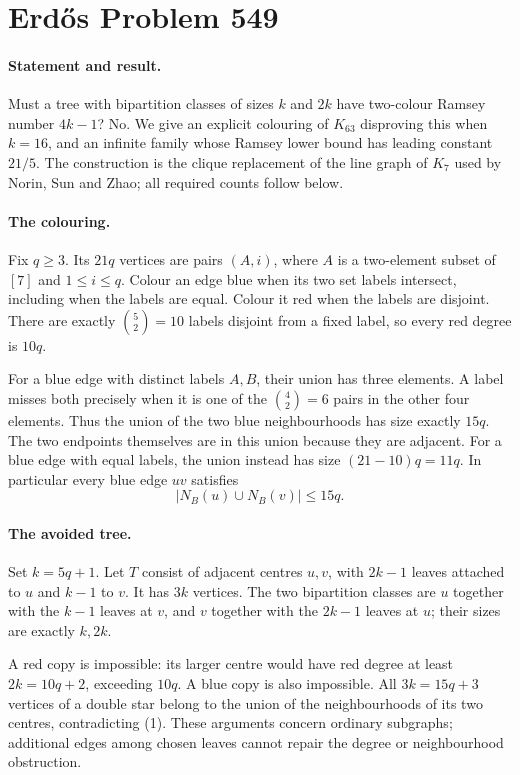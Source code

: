 \section*{Erd\H{o}s Problem 549}

\paragraph{Statement and result.}
Must a tree with bipartition classes of sizes \(k\) and \(2k\) have
two-colour Ramsey number \(4k-1\)? No. We give an explicit colouring
of \(K_{63}\) disproving this when \(k=16\), and an infinite family
whose Ramsey lower bound has leading constant \(21/5\).
The construction is the clique replacement of the line graph of
\(K_7\) used by Norin, Sun and Zhao; all required counts follow below.

\paragraph{The colouring.}
Fix \(q\geq3\). Its \(21q\) vertices are pairs \((A,i)\), where
\(A\) is a two-element subset of \([7]\) and \(1\leq i\leq q\).
Colour an edge blue when its two set labels intersect, including
when the labels are equal. Colour it red when the labels are disjoint.
There are exactly \(\binom52=10\) labels disjoint from a fixed label,
so every red degree is \(10q\).

For a blue edge with distinct labels \(A,B\), their union has three
elements. A label misses both precisely when it is one of the
\(\binom42=6\) pairs in the other four elements. Thus the union of
the two blue neighbourhoods has size exactly \(15q\).
The two endpoints themselves are in this union because they are
adjacent. For a blue edge with equal labels, the union instead has
size \((21-10)q=11q\). In particular every blue edge \(uv\) satisfies
\[
 |N_B(u)\cup N_B(v)|\leq15q. \tag{1}
\]

\paragraph{The avoided tree.}
Set \(k=5q+1\). Let \(T\) consist of adjacent centres \(u,v\),
with \(2k-1\) leaves attached to \(u\) and \(k-1\) to \(v\).
It has \(3k\) vertices. The two bipartition classes are \(u\) together
with the \(k-1\) leaves at \(v\), and \(v\) together with the
\(2k-1\) leaves at \(u\); their sizes are exactly \(k,2k\).

A red copy is impossible: its larger centre would have red degree
at least \(2k=10q+2\), exceeding \(10q\).
A blue copy is also impossible. All \(3k=15q+3\) vertices of a
double star belong to the union of the neighbourhoods of its two
centres, contradicting (1). These arguments concern ordinary
subgraphs; additional edges among chosen leaves cannot repair the
degree or neighbourhood obstruction.

